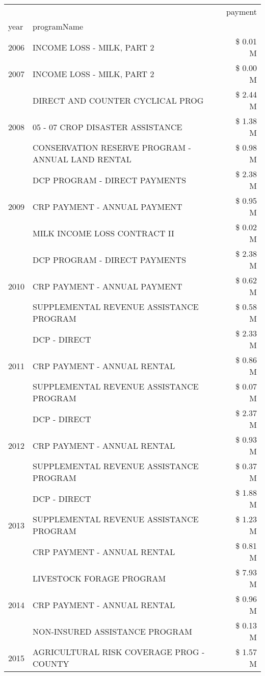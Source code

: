 \begin{tabular}{llr}
\toprule
 &  & payment \\
year & programName &  \\
\midrule
2006 & INCOME LOSS - MILK, PART 2 & \$ 0.01 M \\
\cline{1-3}
2007 & INCOME LOSS - MILK, PART 2 & \$ 0.00 M \\
\cline{1-3}
\multirow[t]{3}{*}{2008} & DIRECT AND COUNTER CYCLICAL PROG & \$ 2.44 M \\
 & 05 - 07 CROP DISASTER ASSISTANCE & \$ 1.38 M \\
 & CONSERVATION RESERVE PROGRAM - ANNUAL LAND RENTAL & \$ 0.98 M \\
\cline{1-3}
\multirow[t]{3}{*}{2009} & DCP PROGRAM - DIRECT PAYMENTS & \$ 2.38 M \\
 & CRP PAYMENT - ANNUAL PAYMENT & \$ 0.95 M \\
 & MILK INCOME LOSS CONTRACT II & \$ 0.02 M \\
\cline{1-3}
\multirow[t]{3}{*}{2010} & DCP PROGRAM - DIRECT PAYMENTS & \$ 2.38 M \\
 & CRP PAYMENT - ANNUAL PAYMENT & \$ 0.62 M \\
 & SUPPLEMENTAL REVENUE ASSISTANCE PROGRAM & \$ 0.58 M \\
\cline{1-3}
\multirow[t]{3}{*}{2011} & DCP - DIRECT & \$ 2.33 M \\
 & CRP PAYMENT - ANNUAL RENTAL & \$ 0.86 M \\
 & SUPPLEMENTAL REVENUE ASSISTANCE PROGRAM & \$ 0.07 M \\
\cline{1-3}
\multirow[t]{3}{*}{2012} & DCP - DIRECT & \$ 2.37 M \\
 & CRP PAYMENT - ANNUAL RENTAL & \$ 0.93 M \\
 & SUPPLEMENTAL REVENUE ASSISTANCE PROGRAM & \$ 0.37 M \\
\cline{1-3}
\multirow[t]{3}{*}{2013} & DCP - DIRECT & \$ 1.88 M \\
 & SUPPLEMENTAL REVENUE ASSISTANCE PROGRAM & \$ 1.23 M \\
 & CRP PAYMENT - ANNUAL RENTAL & \$ 0.81 M \\
\cline{1-3}
\multirow[t]{3}{*}{2014} & LIVESTOCK FORAGE PROGRAM & \$ 7.93 M \\
 & CRP PAYMENT - ANNUAL RENTAL & \$ 0.96 M \\
 & NON-INSURED ASSISTANCE PROGRAM & \$ 0.13 M \\
\cline{1-3}
\multirow[t]{3}{*}{2015} & AGRICULTURAL RISK COVERAGE PROG - COUNTY & \$ 1.57 M \\

\end{tabular}
